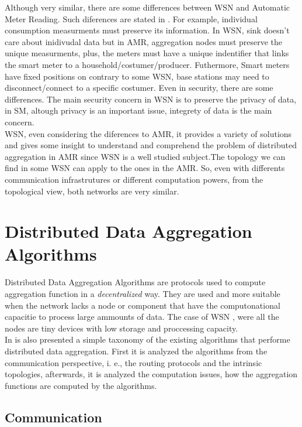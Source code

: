 Although very similar, there are some differences between WSN and Automatic Meter Reading. Such diferences are stated in \cite{khalifa2011survey}. For example, individual consumption measurments must preserve its information. In WSN, sink doesn't care about inidivudal data but in AMR, aggregation nodes must preserve the unique measurments, plus, the meters must have a unique indentifier that links the smart meter to a household/costumer/producer. Futhermore, Smart meters have fixed positions on contrary to some WSN, base stations may need to disconnect/connect to a specific costumer. Even in security, there are some differences. The main security concern in WSN is to preserve the privacy of data, in SM, altough privacy is an important issue, integrety of data is the main concern.\\
WSN, even considering the diferences to AMR, it provides a variety of solutions and gives some insight to understand and comprehend the problem of distributed aggregation in AMR since WSN is a well studied subject.The topology we can find in some WSN can apply to the ones in the AMR. So, even with differents communication infrastrutures or different computation powers,  from the topological view, both networks are very similar.\\

\section{Distributed Data Aggregation Algorithms}
Distributed Data Aggregation Algorithms are protocols used to compute aggregation function in a \textit{decentralized} way. They are used and more suitable when the network lacks a node or component that have the computonational capacitie to process large ammounts of data. The case of WSN , were all the nodes are tiny devices with low storage and proccessing capacity.\\
In \cite{journals/corr/abs-1110-0725} is also presented a simple taxonomy of the existing algorithms that performe distributed data aggregation. First it is analyzed the algorithms from the communication perspective, i. e., the routing protocols and the intrinsic topologies, afterwards, it is analyzed the computation issues, how the aggregation functions are computed by the algorithms.


\subsection{Communication}

